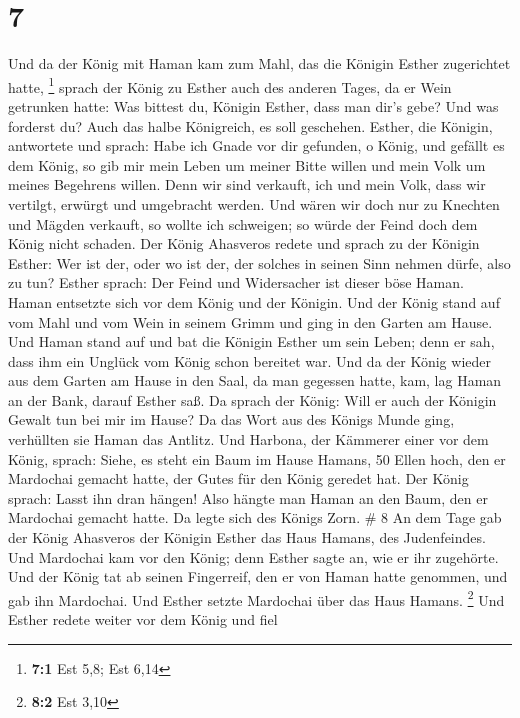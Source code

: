 \hypertarget{section-2}{%
\section{7}\label{section-2}}

 Und da der König mit Haman kam zum Mahl, das die Königin
Esther zugerichtet hatte, \footnote{\textbf{7:1} Est 5,8; Est 6,14}
 sprach der König zu Esther auch des anderen Tages, da er
Wein getrunken hatte: Was bittest du, Königin Esther, dass man dir's
gebe? Und was forderst du? Auch das halbe Königreich, es soll geschehen.
 Esther, die Königin, antwortete und sprach: Habe ich Gnade
vor dir gefunden, o König, und gefällt es dem König, so gib mir mein
Leben um meiner Bitte willen und mein Volk um meines Begehrens willen.
 Denn wir sind verkauft, ich und mein Volk, dass wir
vertilgt, erwürgt und umgebracht werden. Und wären wir doch nur zu
Knechten und Mägden verkauft, so wollte ich schweigen; so würde der
Feind doch dem König nicht schaden.  Der König Ahasveros
redete und sprach zu der Königin Esther: Wer ist der, oder wo ist der,
der solches in seinen Sinn nehmen dürfe, also zu tun? 
Esther sprach: Der Feind und Widersacher ist dieser böse Haman. Haman
entsetzte sich vor dem König und der Königin.  Und der König
stand auf vom Mahl und vom Wein in seinem Grimm und ging in den Garten
am Hause. Und Haman stand auf und bat die Königin Esther um sein Leben;
denn er sah, dass ihm ein Unglück vom König schon bereitet war.
 Und da der König wieder aus dem Garten am Hause in den
Saal, da man gegessen hatte, kam, lag Haman an der Bank, darauf Esther
saß. Da sprach der König: Will er auch der Königin Gewalt tun bei mir im
Hause? Da das Wort aus des Königs Munde ging, verhüllten sie Haman das
Antlitz.  Und Harbona, der Kämmerer einer vor dem König,
sprach: Siehe, es steht ein Baum im Hause Hamans, 50 Ellen hoch, den er
Mardochai gemacht hatte, der Gutes für den König geredet hat. Der König
sprach: Lasst ihn dran hängen!  Also hängte man Haman an
den Baum, den er Mardochai gemacht hatte. Da legte sich des Königs Zorn.
\# 8  An dem Tage gab der König Ahasveros der Königin Esther
das Haus Hamans, des Judenfeindes. Und Mardochai kam vor den König; denn
Esther sagte an, wie er ihr zugehörte.  Und der König tat ab
seinen Fingerreif, den er von Haman hatte genommen, und gab ihn
Mardochai. Und Esther setzte Mardochai über das Haus Hamans. \footnote{\textbf{8:2}
  Est 3,10}  Und Esther redete weiter vor dem König und fiel
